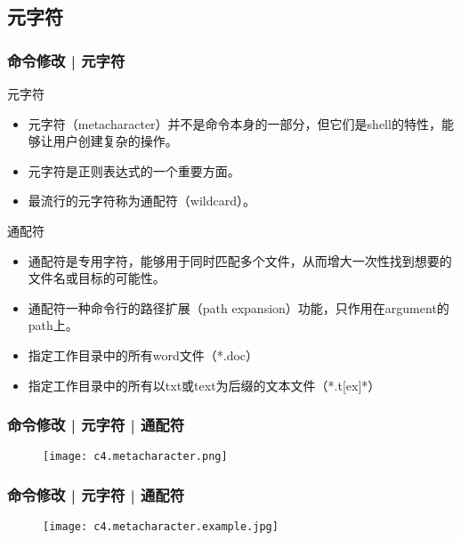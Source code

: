 \subsection{元字符}
\begin{frame}
  \frametitle{命令修改 | 元字符}
  \begin{block}{元字符}
    \begin{itemize}[<+->]
      \item 元字符（metacharacter）并不是命令本身的一部分，但它们是shell的特性，能够让用户创建复杂的操作。
      \item 元字符是正则表达式的一个重要方面。
      \item 最流行的元字符称为通配符（wildcard）。
    \end{itemize}
  \end{block}
  \pause
  \begin{block}{通配符}
    \begin{itemize}[<+->]
      \item 通配符是专用字符，能够用于同时匹配多个文件，从而增大一次性找到想要的文件名或目标的可能性。
      \item 通配符一种命令行的路径扩展（path expansion）功能，只作用在argument的path上。
      \item 指定工作目录中的所有word文件（*.doc）
      \item 指定工作目录中的所有以txt或text为后缀的文本文件（*.t[ex]*）
    \end{itemize}
  \end{block}
\end{frame}

\begin{frame}
  \frametitle{命令修改 | 元字符 | \alert{通配符}}
  \begin{figure}
    \centering
    \texttt{[image: c4.metacharacter.png]}
  \end{figure}
\end{frame}

\begin{frame}
  \frametitle{命令修改 | 元字符 | 通配符}
  \begin{figure}
    \centering
    \texttt{[image: c4.metacharacter.example.jpg]}
  \end{figure}
\end{frame}

